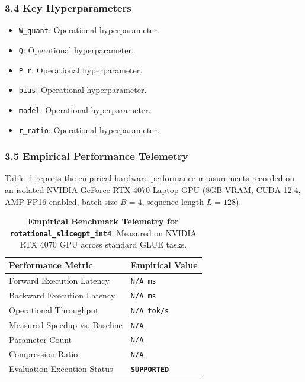 \subsubsection*{3.4 Key Hyperparameters}
\begin{itemize}
    \item \texttt{W\_quant}: Operational hyperparameter.
    \item \texttt{Q}: Operational hyperparameter.
    \item \texttt{P\_r}: Operational hyperparameter.
    \item \texttt{bias}: Operational hyperparameter.
    \item \texttt{model}: Operational hyperparameter.
    \item \texttt{r\_ratio}: Operational hyperparameter.
\end{itemize}

\subsubsection*{3.5 Empirical Performance Telemetry}
Table~\ref{tab:telemetry_rotational_slicegpt_int4} reports the empirical hardware performance measurements recorded on an isolated NVIDIA GeForce RTX 4070 Laptop GPU (8GB VRAM, CUDA 12.4, AMP FP16 enabled, batch size $B=4$, sequence length $L=128$).

\begin{table}[h]
\centering
\small
\caption{\textbf{Empirical Benchmark Telemetry for \texttt{rotational\_slicegpt\_int4}}. Measured on NVIDIA RTX 4070 GPU across standard GLUE tasks.}
\label{tab:telemetry_rotational_slicegpt_int4}
\begin{tabularx}{\columnwidth}{lX}
\toprule
\textbf{Performance Metric} & \textbf{Empirical Value} \\
\midrule
Forward Execution Latency & \texttt{N/A ms} \\
Backward Execution Latency & \texttt{N/A ms} \\
Operational Throughput & \texttt{N/A tok/s} \\
Measured Speedup vs. Baseline & \texttt{N/A} \\
Parameter Count & \texttt{N/A} \\
Compression Ratio & \texttt{N/A} \\
Evaluation Execution Status & \textbf{\texttt{SUPPORTED}} \\
\bottomrule
\end{tabularx}
\end{table}

